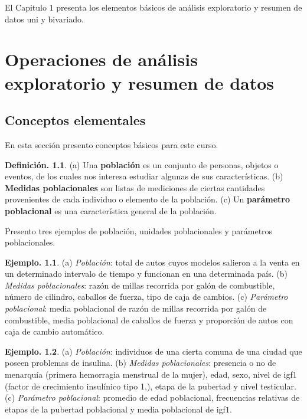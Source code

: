 \documentclass[]{book}
\theoremstyle{definition}
\newtheorem{definition}{Definición.}[chapter]
\theoremstyle{definition}
\newtheorem{example}{Ejemplo.}[chapter]
\theoremstyle{definition}
\theoremstyle{remark}
\begin{document}
El Capitulo \(1\) presenta los elementos básicos de análisis
exploratorio y resumen de datos uni y bivariado.

\hypertarget{datos}{%
\chapter{Operaciones de análisis exploratorio y resumen de datos}\label{datos}}

\hypertarget{conceptos-elementales}{%
\section{Conceptos elementales}\label{conceptos-elementales}}

En esta sección presento conceptos básicos para
este
curso.

\begin{definition}
\protect\hypertarget{def:unnamed-chunk-7}{}{\label{def:unnamed-chunk-7} }(a) Una \textbf{población} es un conjunto de personas,
objetos
o eventos, de los
cuales nos interesa estudiar algunas de sus
características. (b) \textbf{Medidas poblacionales} son
listas
de mediciones de ciertas cantidades provenientes
de cada
individuo o elemento de la población. (c) Un
\textbf{parámetro
poblacional} es una característica general de la
población.
\end{definition}

Presento tres ejemplos de población, unidades
poblacionales y parámetros poblacionales.

\begin{example}
\protect\hypertarget{exm:unnamed-chunk-8}{}{\label{exm:unnamed-chunk-8} }(a) \emph{Población}: total de autos cuyos modelos
salieron a
la venta en un determinado intervalo de tiempo y
funcionan en una determinada país. (b) \emph{Medidas
poblacionales}: razón de millas recorrida por
galón de
combustible, número de cilindro, caballos de
fuerza, tipo
de caja de cambios. (c) \emph{Parámetro poblacional}:
media
poblacional de razón de millas recorrida por galón
de
combustible, media poblacional de caballos de
fuerza y
proporción de autos con caja de cambio automático.
\end{example}

\begin{example}
\protect\hypertarget{exm:unnamed-chunk-9}{}{\label{exm:unnamed-chunk-9} }(a) \emph{Población}: individuos de una cierta comuna
de una
ciudad que poseen problemas de insulina.
(b) \emph{Medidas poblacionales}: presencia o no de
menarquía
(primera hemorragia menstrual de la mujer), edad,
sexo,
nivel de igf1 (factor de crecimiento insulínico
tipo 1,),
etapa de la pubertad y nivel testicular. (c)
\emph{Parámetro
poblacional}: promedio de edad poblacional,
frecuencias
relativas de etapas de la pubertad poblacional y
media
poblacional de igf\(1\).
\end{example}
\end{document}
